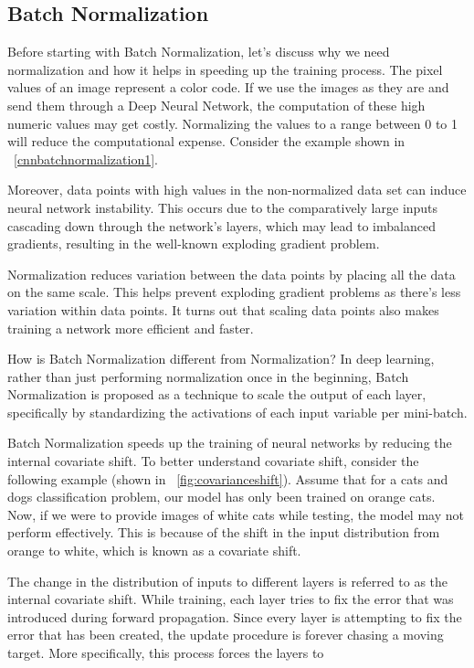 	\subsection{Batch Normalization}
	\begin{bulletedlist}
		\item Before starting with Batch Normalization, let's discuss why we need normalization and how it helps in speeding up the training process.  The pixel values of an image represent a color code. If we use the images as they are and send them through a Deep Neural Network, the computation of these high numeric values may get costly. Normalizing the values to a range between 0 to 1 will reduce the computational expense.  Consider the example shown in \figurename~\ref{cnnbatchnormalization1}.
		\item Moreover, data points with high values in the non-normalized data set can induce neural network instability. This occurs due to the comparatively large inputs cascading down through the network's layers, which may lead to imbalanced gradients, resulting in the well-known exploding gradient problem.
		\item Normalization reduces variation between the data points by placing all the data on the same scale. This helps prevent exploding gradient problems as there's less variation within data points.  It turns out that scaling data points also makes training a network more efficient and faster.
		\item How is Batch Normalization different from Normalization?  In deep learning, rather than just performing normalization once in the beginning, Batch Normalization is proposed as a technique to scale the output of each layer, specifically by standardizing the activations of each input variable per mini-batch.
		\item Batch Normalization speeds up the training of neural networks by reducing the internal covariate shift.  To better understand covariate shift, consider the following example (shown in \figurename~\ref{fig:covarianceshift}).  Assume that for a cats and dogs classification problem, our model has only been trained on orange cats.  Now, if we were to provide images of white cats while testing, the model may not perform effectively.  This is because of the shift in the input distribution from orange to white, which is known as a covariate shift.
		\item The change in the distribution of inputs to different layers is referred to as the internal covariate shift. While training, each layer tries to fix the error that was introduced during forward propagation. Since every layer is attempting to fix the error that has been created, the update procedure is forever chasing a moving target. More specifically, this process forces the layers to

\end{bulletedlist}
